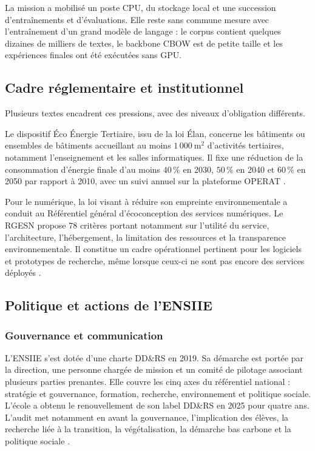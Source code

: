 La mission a mobilisé un poste CPU, du stockage local et une succession
d'entraînements et d'évaluations. Elle reste sans commune mesure avec
l'entraînement d'un grand modèle de langage : le corpus contient quelques
dizaines de milliers de textes, le backbone CBOW est de petite taille et les
expériences finales ont été exécutées sans GPU.

\subsection{Cadre réglementaire et institutionnel}
\label{ssec:ddrs_reglementation}

Plusieurs textes encadrent ces pressions, avec des niveaux d'obligation
différents.

Le dispositif Éco Énergie Tertiaire, issu de la loi Élan, concerne les
bâtiments ou ensembles de bâtiments accueillant au moins $1\,000~\mathrm{m^2}$
d'activités tertiaires, notamment l'enseignement et les salles informatiques.
Il fixe une réduction de la consommation d'énergie finale d'au moins
$40\,\%$ en 2030, $50\,\%$ en 2040 et $60\,\%$ en 2050 par rapport à 2010,
avec un suivi annuel sur la plateforme OPERAT
\cite{ecologieEcoEnergieTertiaire2025}.

Pour le numérique, la loi visant à réduire son empreinte environnementale a
conduit au Référentiel général d'écoconception des services numériques. Le
RGESN propose 78 critères portant notamment sur l'utilité du service,
l'architecture, l'hébergement, la limitation des ressources et la transparence
environnementale. Il constitue un cadre opérationnel pertinent pour les
logiciels et prototypes de recherche, même lorsque ceux-ci ne sont pas encore
des services déployés \cite{arcepRGESN2024}.

\subsection{Politique et actions de l'ENSIIE}
\label{ssec:ddrs_politique_ensiie}

\subsubsection{Gouvernance et communication}

L'ENSIIE s'est dotée d'une charte DD\&RS en 2019. Sa démarche est portée par
la direction, une personne chargée de mission et un comité de pilotage associant
plusieurs parties prenantes. Elle couvre les cinq axes du référentiel national :
stratégie et gouvernance, formation, recherche, environnement et politique
sociale. L'école a obtenu le renouvellement de son label DD\&RS en 2025 pour
quatre ans. L'audit met notamment en avant la gouvernance, l'implication des
élèves, la recherche liée à la transition, la végétalisation, la démarche bas
carbone et la politique sociale \cite{ensiieLabelDDRS2025}.

